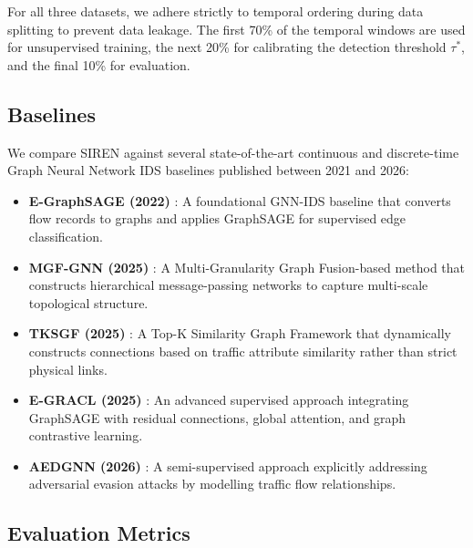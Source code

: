 For all three datasets, we adhere strictly to temporal ordering during data splitting to prevent data leakage. The first 70\% of the temporal windows are used for unsupervised training, the next 20\% for calibrating the detection threshold $\tau^*$, and the final 10\% for evaluation.

\subsection{Baselines}

We compare SIREN against several state-of-the-art continuous and discrete-time Graph Neural Network IDS baselines published between 2021 and 2026:

\begin{itemize}
    \item \textbf{E-GraphSAGE (2022)} \cite{Lo2022egraphsage}: A foundational GNN-IDS baseline that converts flow records to graphs and applies GraphSAGE for supervised edge classification.
    \item \textbf{MGF-GNN (2025)} \cite{Liu2025mgfgnn}: A Multi-Granularity Graph Fusion-based method that constructs hierarchical message-passing networks to capture multi-scale topological structure.
    \item \textbf{TKSGF (2025)} \cite{Ngo2025tksgf}: A Top-K Similarity Graph Framework that dynamically constructs connections based on traffic attribute similarity rather than strict physical links.
    \item \textbf{E-GRACL (2025)} \cite{Lin2025egracl}: An advanced supervised approach integrating GraphSAGE with residual connections, global attention, and graph contrastive learning.
    \item \textbf{AEDGNN (2026)} \cite{Zhang2026aedgnn}: A semi-supervised approach explicitly addressing adversarial evasion attacks by modelling traffic flow relationships.
\end{itemize}

\subsection{Evaluation Metrics}

